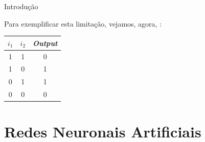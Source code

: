 \begin{frame}{Introdução \cont}
	    
	Para exemplificar esta limitação, vejamos, agora, :
	    
	\medskip
	
	\begin{minipage}{0.45\linewidth}
		\begin{table}
			\centering
			\begin{tabular}{ccc}
				\toprule
				$i_1$ & $i_2$ & \textit{Output} \\
				\midrule
				1     & 1     & 0               \\
				1     & 0     & 1               \\
				0     & 1     & 1               \\
				0     & 0     & 0               \\
				\bottomrule
			\end{tabular}
		\end{table}
	\end{minipage}
	\begin{minipage}{0.45\linewidth}
		\begin{figure}
			\centering
			\resizebox{!}{0.7\textwidth}{
				
			}
		\end{figure}
	\end{minipage}
    
    \medskip
    
	
\end{frame}

\section{Redes Neuronais Artificiais}

